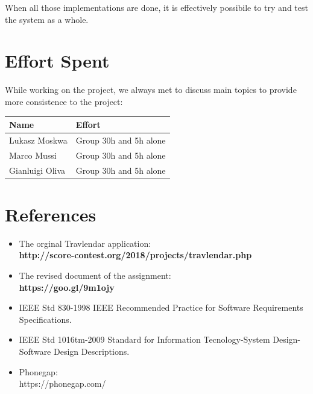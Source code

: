 \documentclass[numbers=noenddot, 12pt, a4paper, oneside]{scrbook}
\begin{document}
When all those implementations are done, it is effectively possibile to try and test the system as a whole.



\chapter{Effort Spent}

While working on the project, we always met to discuss main topics to provide more consistence to the project:\\

\begin{tabular}{|p{}|p{}|}
	\hline
	\parbox[c][6ex]{6ex}{\centering \textbf{Name}} & \textbf{Effort}
	\\
	\hline
	\parbox[c][8ex]{6ex}{\centering Lukasz Moskwa} & Group 30h and 5h alone\\
	\hline
	\parbox[c][8ex]{6ex}{\centering Marco Mussi} & Group 30h and 5h alone\\
	\hline
	\parbox[c][8ex]{6ex}{\centering Gianluigi Oliva} & Group 30h and 5h alone \\
	\hline



\end{tabular}

\chapter{References}

\begin{itemize}
	\item The orginal Travlendar application: \\
	\textbf{http://score-contest.org/2018/projects/travlendar.php}
	\item The revised document of the assignment:\\
	\textbf{https://goo.gl/9m1ojy}
	\item IEEE Std 830-1998 IEEE Recommended Practice for Software Requirements Specifications.
	\item IEEE Std 1016tm-2009 Standard for Information Tecnology-System Design-Software Design Descriptions.
	\item Phonegap: \\
	https://phonegap.com/
\end{itemize}
\end{document}
